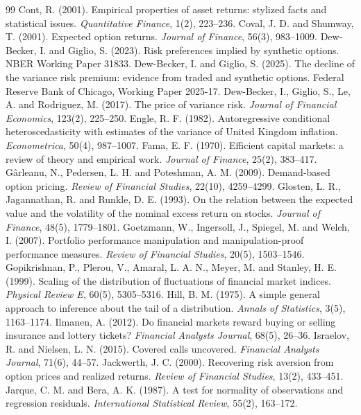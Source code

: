 \documentclass[11pt,a4paper]{article}
\begin{document}
\begin{thebibliography}{99}
\bibitem{} Cont, R. (2001). Empirical properties of asset returns: stylized facts and statistical issues. \emph{Quantitative Finance}, 1(2), 223--236.
\bibitem{} Coval, J. D. and Shumway, T. (2001). Expected option returns. \emph{Journal of Finance}, 56(3), 983--1009.
\bibitem{} Dew-Becker, I. and Giglio, S. (2023). Risk preferences implied by synthetic options. NBER Working Paper 31833.
\bibitem{} Dew-Becker, I. and Giglio, S. (2025). The decline of the variance risk premium: evidence from traded and synthetic options. Federal Reserve Bank of Chicago, Working Paper 2025-17.
\bibitem{} Dew-Becker, I., Giglio, S., Le, A. and Rodriguez, M. (2017). The price of variance risk. \emph{Journal of Financial Economics}, 123(2), 225--250.
\bibitem{} Engle, R. F. (1982). Autoregressive conditional heteroscedasticity with estimates of the variance of United Kingdom inflation. \emph{Econometrica}, 50(4), 987--1007.
\bibitem{} Fama, E. F. (1970). Efficient capital markets: a review of theory and empirical work. \emph{Journal of Finance}, 25(2), 383--417.
\bibitem{} Gârleanu, N., Pedersen, L. H. and Poteshman, A. M. (2009). Demand-based option pricing. \emph{Review of Financial Studies}, 22(10), 4259--4299.
\bibitem{} Glosten, L. R., Jagannathan, R. and Runkle, D. E. (1993). On the relation between the expected value and the volatility of the nominal excess return on stocks. \emph{Journal of Finance}, 48(5), 1779--1801.
\bibitem{} Goetzmann, W., Ingersoll, J., Spiegel, M. and Welch, I. (2007). Portfolio performance manipulation and manipulation-proof performance measures. \emph{Review of Financial Studies}, 20(5), 1503--1546.
\bibitem{} Gopikrishnan, P., Plerou, V., Amaral, L. A. N., Meyer, M. and Stanley, H. E. (1999). Scaling of the distribution of fluctuations of financial market indices. \emph{Physical Review E}, 60(5), 5305--5316.
\bibitem{} Hill, B. M. (1975). A simple general approach to inference about the tail of a distribution. \emph{Annals of Statistics}, 3(5), 1163--1174.
\bibitem{} Ilmanen, A. (2012). Do financial markets reward buying or selling insurance and lottery tickets? \emph{Financial Analysts Journal}, 68(5), 26--36.
\bibitem{} Israelov, R. and Nielsen, L. N. (2015). Covered calls uncovered. \emph{Financial Analysts Journal}, 71(6), 44--57.
\bibitem{} Jackwerth, J. C. (2000). Recovering risk aversion from option prices and realized returns. \emph{Review of Financial Studies}, 13(2), 433--451.
\bibitem{} Jarque, C. M. and Bera, A. K. (1987). A test for normality of observations and regression residuals. \emph{International Statistical Review}, 55(2), 163--172.

\end{thebibliography}
\end{document}
